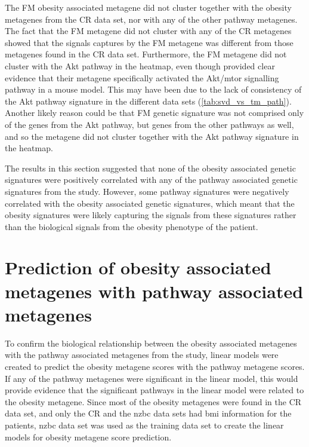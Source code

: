 The FM obesity associated metagene did not cluster together with the obesity metagenes from the CR data set, nor with any of the other pathway metagenes.
The fact that the FM metagene did not cluster with any of the CR metagenes showed that the signals captures by the FM metagene was different from those metagenes found in the CR data set.
Furthermore, the FM metagene did not cluster with the Akt pathway in the heatmap, even though \citet{Fuentes-Mattei2014} provided clear evidence that their metagene specifically activated the Akt/\gls{mtor} signalling pathway in a mouse model.
This may have been due to the lack of consistency of the Akt pathway signature in the different data sets (\cref{tab:svd_vs_tm_path}).
Another likely reason could be that FM genetic signature was not comprised only of the genes from the Akt pathway, but genes from the other pathways as well, and so the metagene did not cluster together with the Akt pathway signature in the heatmap.

The results in this section suggested that none of the obesity associated genetic signatures were positively correlated with any of the pathway associated genetic signatures from the \citet{Gatza2010a} study.
However, some pathway signatures were negatively correlated with the obesity associated genetic signatures, which meant that the obesity signatures were likely capturing the signals from these signatures  rather than the biological signals from the obesity phenotype of the patient.

\vspace{-3mm}

\section{Prediction of obesity associated metagenes with pathway associated metagenes}
\label{sec:prediction_of_obesity_associated_metagene_with_pathway_associate_metagene}

To confirm the biological relationship between the obesity associated metagenes with the pathway associated metagenes from the \citet{Gatza2010a} study, linear models were created to predict the obesity metagene scores with the pathway metagene scores.
If any of the pathway metagenes were significant in the linear model, this would provide evidence that the significant pathways in the linear model were related to the obesity metagene.
Since most of the obesity metagenes were found in the CR data set, and only the CR and the \gls{nzbc} data sets had \gls{bmi} information for the patients, \gls{nzbc} data set was used as the training data set to create the linear models for obesity metagene score prediction.

